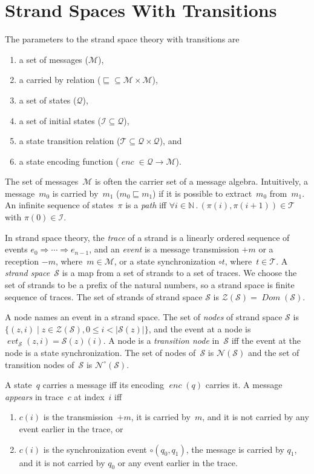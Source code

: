 \documentclass[12pt]{article}
\newcommand{\fn}[1]{\ensuremath{\operatorname{\mathit{#1}}}}
\newcommand{\inbnd}{\mathord -}
\newcommand{\outbnd}{\mathord +}
\newcommand{\neutral}{\mathord\circ}
\newcommand{\nat}{\ensuremath{\mathbb{N}}}
\newcommand{\all}[1]{\forall#1\mathpunct.}
\newcommand{\msg}{\ensuremath{\mathcal{M}}}
\newcommand{\ssp}{\ensuremath{\mathcal{S}}}
\newcommand{\sta}{\ensuremath{\mathcal{Q}}}
\newcommand{\strands}{\ensuremath{\mathcal{Z}}}
\newcommand{\nodes}{\ensuremath{\mathcal{N}}}
\newcommand{\nnodes}{\nodes^{\neutral}}
\newcommand{\init}{\ensuremath{\mathcal{I}}}
\newcommand{\tran}{\ensuremath{\mathcal{T}}}
\newcommand{\pth}{\ensuremath{\pi}}
\newcommand{\encode}{\fn{enc}}
\newcommand{\evt}{\fn{evt}}
\newcommand{\dom}{\fn{Dom}}
\begin{document}
\section{Strand Spaces With Transitions}\label{sec:strand spaces}

The parameters to the strand space theory with transitions are
\begin{enumerate}
\item a set of messages (\msg),
\item a carried by relation (${\sqsubseteq}\subseteq\msg\times\msg$),
\item a set of states (\sta),
\item a set of initial states ($\init\subseteq\sta$),
\item a state transition relation ($\tran\subseteq\sta\times\sta$), and
\item a state encoding function ($\encode\in\sta\to\msg$).
\end{enumerate}
The set of messages~{\msg} is often the carrier set of a message
algebra.  Intuitively, a message~$m_0$ is carried by~$m_1$
($m_0\sqsubseteq m_1$) if it is possible to extract~$m_0$ from~$m_1$.
An infinite sequence of states~$\pth$ is a \emph{path} iff
$\all{i\in\nat}(\pth(i),\pth(i+1))\in\tran$ with $\pth(0)\in\init$.

In strand space theory, the \emph{trace} of a strand is a linearly
ordered sequence of events $e_0\Rightarrow\cdots\Rightarrow e_{n-1}$,
and an \emph{event} is a message transmission $\outbnd m$ or a
reception $\inbnd m$, where~$m\in\msg$, or a state synchronization
$\neutral t$, where~$t\in\tran$.  A \emph{strand space}~$\ssp$ is a
map from a set of strands to a set of traces.  We choose the set of
strands to be a prefix of the natural numbers, so a strand space is
finite sequence of traces.  The set of strands of strand space {\ssp}
is $\strands(\ssp)=\dom(\ssp)$.

A node names an event in a strand space.  The set of \emph{nodes} of
strand space $\ssp$ is $\{(z,i)\mid z\in\strands(\ssp), 0\leq i <
|\ssp(z)|\}$, and the event at a node is $\evt_\ssp(z,i)=\ssp(z)(i)$.
A node is a \emph{transition node} in~$\ssp$ iff the event at the node
is a state synchronization.  The set of nodes of~$\ssp$ is
$\nodes(\ssp)$ and the set of transition nodes of~$\ssp$ is
$\nnodes(\ssp)$.

A state~$q$ carries a message iff its encoding $\encode(q)$ carries it.
A message \emph{appears} in trace~$c$ at index~$i$ iff
\begin{enumerate}
\item $c(i)$ is the transmission~$\outbnd m$, it is carried by~$m$,
  and it is not carried by any event earlier in the trace, or
\item $c(i)$ is the synchronization
event $\neutral(q_0,q_1)$, the message is carried by $q_1$,
and it is not carried by $q_0$ or any event earlier in the
trace.
\end{enumerate}
\end{document}
